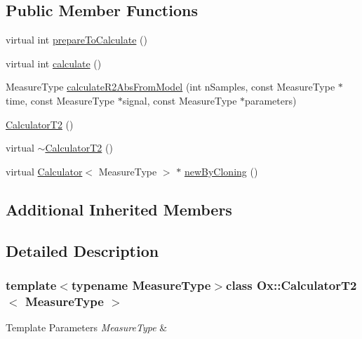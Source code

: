 \subsection*{Public Member Functions}
\begin{DoxyCompactItemize}
\item 
virtual int \hyperlink{class_ox_1_1_calculator_t2_a56e2bcb27465a83dd1a1150b7fe419c8}{prepare\-To\-Calculate} ()
\item 
virtual int \hyperlink{class_ox_1_1_calculator_t2_a8afe4974f3253edea4386a87695607ae}{calculate} ()
\item 
Measure\-Type \hyperlink{class_ox_1_1_calculator_t2_ace5f0515839bdffffb3d60e4536167b6}{calculate\-R2\-Abs\-From\-Model} (int n\-Samples, const Measure\-Type $\ast$time, const Measure\-Type $\ast$signal, const Measure\-Type $\ast$parameters)
\item 
\hyperlink{class_ox_1_1_calculator_t2_a9d0d9d252c322a6db51693ef42c0bed7}{Calculator\-T2} ()
\item 
virtual \hyperlink{class_ox_1_1_calculator_t2_a0a8e02ccb647bb1faf00dbcd4f61124c}{$\sim$\-Calculator\-T2} ()
\item 
virtual \hyperlink{class_ox_1_1_calculator}{Calculator}$<$ Measure\-Type $>$ $\ast$ \hyperlink{class_ox_1_1_calculator_t2_aaec3b1e6254b67b309c9beedb54ad9e7}{new\-By\-Cloning} ()
\end{DoxyCompactItemize}
\subsection*{Additional Inherited Members}


\subsection{Detailed Description}
\subsubsection*{template$<$typename Measure\-Type$>$class Ox\-::\-Calculator\-T2$<$ Measure\-Type $>$}


\begin{DoxyTemplParams}{Template Parameters}
{\em Measure\-Type} & \\
\hline
\end{DoxyTemplParams}


